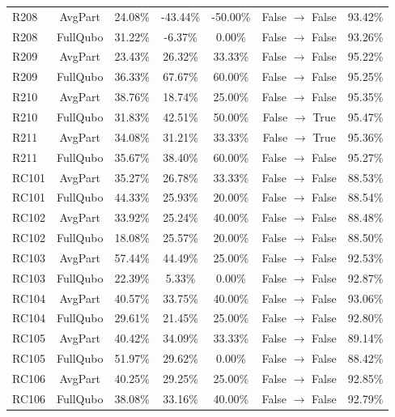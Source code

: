 \documentclass[conference]{IEEEtran}
\begin{document}
\begin{table}[htbp]
{\begin{tabular}{lcccccc}
R208 & AvgPart & 24.08\% & -43.44\% & -50.00\% & False $\to$ False & 93.42\% \\
R208 & FullQubo & 31.22\% & -6.37\% & 0.00\% & False $\to$ False & 93.26\% \\

R209 & AvgPart & 23.43\% & 26.32\% & 33.33\% & False $\to$ False & 95.22\% \\
R209 & FullQubo & 36.33\% & 67.67\% & 60.00\% & False $\to$ False & 95.25\% \\

R210 & AvgPart & 38.76\% & 18.74\% & 25.00\% & False $\to$ False & 95.35\% \\
R210 & FullQubo & 31.83\% & 42.51\% & 50.00\% & False $\to$ True & 95.47\% \\

R211 & AvgPart & 34.08\% & 31.21\% & 33.33\% & False $\to$ True & 95.36\% \\
R211 & FullQubo & 35.67\% & 38.40\% & 60.00\% & False $\to$ False & 95.27\% \\

RC101 & AvgPart & 35.27\% & 26.78\% & 33.33\% & False $\to$ False & 88.53\% \\
RC101 & FullQubo & 44.33\% & 25.93\% & 20.00\% & False $\to$ False & 88.54\% \\

RC102 & AvgPart & 33.92\% & 25.24\% & 40.00\% & False $\to$ False & 88.48\% \\
RC102 & FullQubo & 18.08\% & 25.57\% & 20.00\% & False $\to$ False & 88.50\% \\

RC103 & AvgPart & 57.44\% & 44.49\% & 25.00\% & False $\to$ False & 92.53\% \\
RC103 & FullQubo & 22.39\% & 5.33\% & 0.00\% & False $\to$ False & 92.87\% \\

RC104 & AvgPart & 40.57\% & 33.75\% & 40.00\% & False $\to$ False & 93.06\% \\
RC104 & FullQubo & 29.61\% & 21.45\% & 25.00\% & False $\to$ False & 92.80\% \\

RC105 & AvgPart & 40.42\% & 34.09\% & 33.33\% & False $\to$ False & 89.14\% \\
RC105 & FullQubo & 51.97\% & 29.62\% & 0.00\% & False $\to$ False & 88.42\% \\

RC106 & AvgPart & 40.25\% & 29.25\% & 25.00\% & False $\to$ False & 92.85\% \\
RC106 & FullQubo & 38.08\% & 33.16\% & 40.00\% & False $\to$ False & 92.79\% \\


\end{tabular}}
\end{table}
\end{document}
